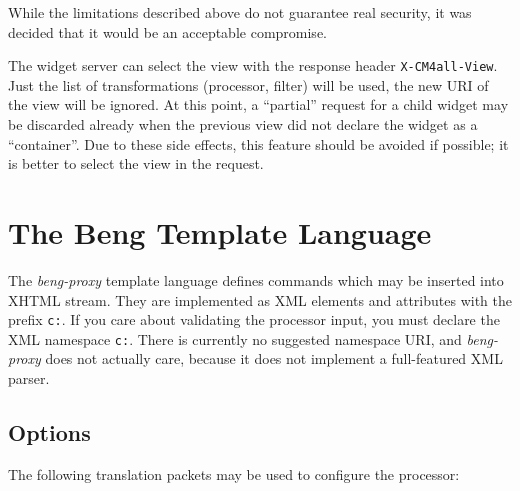 \documentclass[a4paper,12pt]{article}
\begin{document}
While the limitations described above do not guarantee real
security, it was decided that it would be an acceptable compromise.

The widget server can select the view with the response header
\texttt{X-CM4all-View}.  Just the list of transformations (processor,
filter) will be used, the new URI of the view will be ignored.  At
this point, a ``partial'' request for a child widget may be discarded
already when the previous view did not declare the widget as a
``container''.  Due to these side effects, this feature should be
avoided if possible; it is better to select the view in the request.

\section{The Beng Template Language}
\label{processor}

The \emph{beng-proxy} template language defines commands which may be
inserted into XHTML stream.  They are implemented as XML elements and
attributes with the prefix \texttt{c:}.  If you care about validating
the processor input, you must declare the XML namespace \texttt{c:}.
There is currently no suggested namespace URI, and \emph{beng-proxy}
does not actually care, because it does not implement a full-featured
XML parser.

\subsection{Options}

The following translation packets may be used to configure the
processor:
\end{document}
